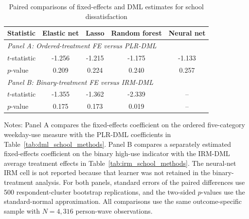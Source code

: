 \begin{table}[!htbp]
\centering
\caption{Paired comparisons of fixed-effects and DML estimates for school dissatisfaction}
\label{tab:fe_dml_comparison_school_dissatisfaction}
\small
\setlength{\tabcolsep}{6pt}
\begin{tabular}{lcccc}
\hline
Statistic & Elastic net & Lasso & Random forest & Neural net
\\
\hline
\multicolumn{5}{l}{\textit{Panel A: Ordered-treatment FE versus PLR-DML}} \\
$t$-statistic & -1.256 & -1.215 & -1.175 & -1.133
\\
$p$-value & 0.209 & 0.224 & 0.240 & 0.257
\\[0.4ex]
\multicolumn{5}{l}{\textit{Panel B: Binary-treatment FE versus IRM-DML}} \\
$t$-statistic & -1.355 & -1.362 & -2.339 & --
\\
$p$-value & 0.175 & 0.173 & 0.019 & --
\\
\hline
\end{tabular}
\begin{minipage}{0.96\textwidth}
\footnotesize Notes: Panel A compares the fixed-effects coefficient on the ordered five-category weekday-use measure with the PLR-DML coefficients in Table~\ref{tab:dml_school_methods}. Panel B compares a separately estimated fixed-effects coefficient on the binary high-use indicator with the IRM-DML average treatment effects in Table~\ref{tab:irm_school_methods}. The neural-net IRM cell is not reported because that learner was not retained in the binary-treatment analysis. For both panels, standard errors of the paired differences use 500 respondent-cluster bootstrap replications, and the two-sided $p$-values use the standard-normal approximation. All comparisons use the same outcome-specific sample with $N=4,316$ person-wave observations.
\end{minipage}
\end{table}
